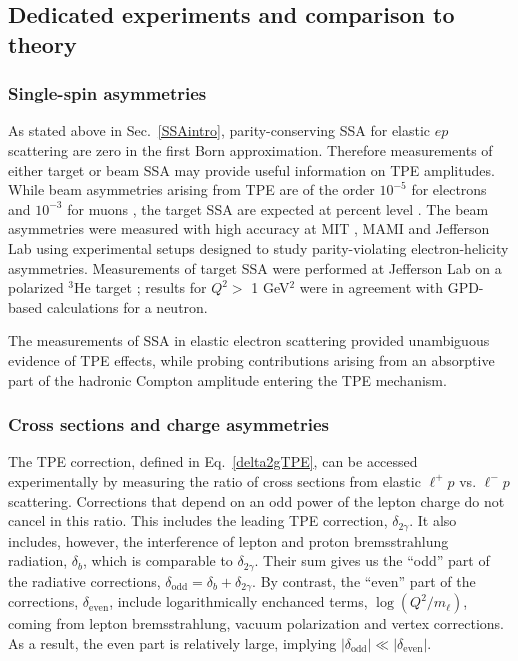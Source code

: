 \subsection{Dedicated experiments and comparison to theory}\label{Sec:Experiments}

\subsubsection{Single-spin asymmetries}

As stated above in Sec.~\ref{SSAintro}, parity-conserving SSA for elastic $ep$ scattering are zero in the first Born approximation. Therefore measurements of either target or beam SSA may provide useful information on TPE amplitudes. While beam asymmetries arising from TPE are of the order $10^{-5}$ for electrons \cite{Afanasev:2004pu,Gorchtein:2004ac, pasquini2004resonance} and $10^{-3}$ for muons \cite{Koshchii:2019b}, the target SSA are expected at percent level \cite{Afanasev:2005prd}. The beam asymmetries were measured with high accuracy at MIT \cite{Wells:2001bn}, MAMI \cite{maas2005measurement} and Jefferson Lab \cite{armstrong2007transverse,Androic:2012bn,Abrahamyan:2012bn,PREX:2021uwt} using experimental setups designed to study parity-violating electron-helicity asymmetries. Measurements of target SSA were performed at Jefferson Lab on a polarized $^3$He target \cite{Zhang:2015kna}; results for $Q^2>$ 1 GeV$^2$ were in agreement with GPD-based calculations \cite{Afanasev:2005prd} for a neutron. 

The measurements of SSA in elastic electron scattering provided unambiguous evidence of TPE effects, while probing contributions arising from an absorptive part of the hadronic Compton amplitude entering the TPE mechanism. 



\subsubsection{Cross sections and charge asymmetries}

The TPE correction, defined in Eq.~\ref{delta2gTPE}, can be accessed experimentally by measuring the ratio of cross sections from elastic $\ell ^+p$ vs. $\ell^- p$ scattering. Corrections that depend on an odd power of the lepton charge do not cancel in this ratio. This includes the leading TPE correction, $\delta_{2\gamma}$. It also includes, however, the interference of lepton and proton bremsstrahlung radiation,  $\delta_{b}$, which is comparable to $\delta_{2\gamma}$. Their sum gives us the ``odd'' part of the radiative corrections, $\delta_{\text{odd}}=\delta_{b}+\delta_{2\gamma}$.
By contrast, the ``even'' part of the corrections, $\delta_{\text{even}}$, include logarithmically enchanced terms, $\log (Q^2/m_{\ell})$, coming from lepton bremsstrahlung, vacuum polarization and vertex corrections. As a result, the even part is relatively large, implying $|\delta_{\text{odd}}| \ll |\delta_{\text{even}}|$.

